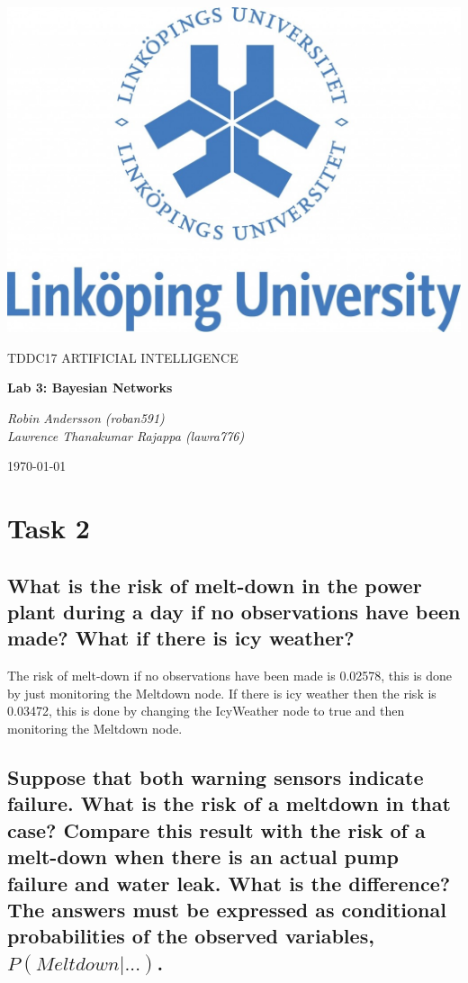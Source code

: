 \documentclass[a4paper,10pt]{article}
\begin{document}
\begin{titlepage}
	\centering
	\includegraphics[width=.6\textwidth]{liu-logo.png}\par
	\vfill
	{\scshape\Large TDDC17 ARTIFICIAL INTELLIGENCE\par}
	{\huge\bfseries Lab 3: Bayesian Networks\par}
	\vspace{1cm}
	{\large\itshape Robin Andersson (roban591) \\ Lawrence Thanakumar Rajappa (lawra776)\par}
	\vfill
	{\large \today\par}
\end{titlepage}

\section{Task 2}

\subsection{What is the risk of melt-down in the power plant during a day if no observations have been made? What if there is icy weather?}

The risk of melt-down if no observations have been made is 0.02578, this is done by just monitoring the Meltdown node.
If there is icy weather then the risk is 0.03472, this is done by changing the IcyWeather node to true and then monitoring the Meltdown node.

\subsection{Suppose that both warning sensors indicate failure. 
What is the risk of a meltdown in that case? 
Compare this result with the risk of a melt-down when there is an actual pump failure and water leak. 
What is the difference? 
The answers must be expressed as conditional probabilities of the observed variables, $P(Meltdown | ...)$.}
\end{document}
